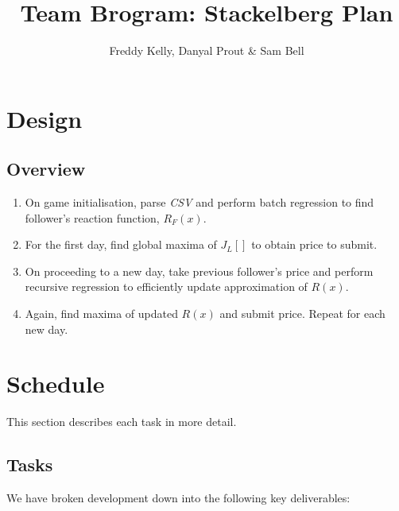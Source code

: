 \documentclass[10pt,a4paper]{report}
\title{Team Brogram: Stackelberg Plan}
\author{Freddy Kelly, Danyal Prout \& Sam Bell}
\begin{document}
\maketitle

\tableofcontents

\newpage

\section{Design}

\subsection{Overview}
\begin{enumerate}
  \item On game initialisation, parse \emph{CSV} and perform batch regression to find follower's reaction function, $R_F(x)$.
  \item For the first day, find global maxima of $J_L[]$ to obtain price to submit.
  \item On proceeding to a new day, take previous follower's price and perform recursive regression to efficiently update approximation of $R(x)$.
  \item Again, find maxima of updated $R(x)$ and submit price. Repeat for each new day.
\end{enumerate}


\newpage
\section{Schedule}
This section describes each task in more detail.

\subsection{Tasks}
We have broken development down into the following key deliverables:
\end{document}
